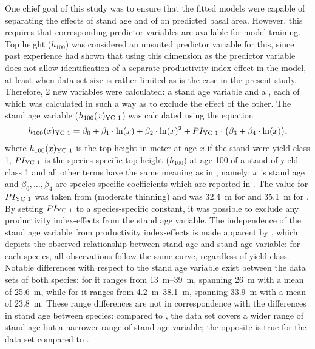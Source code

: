 One chief goal of this study was to ensure that the fitted models were capable of separating the effects of stand age and of \ProductivityIndexText{} on predicted basal area.  However, this requires that corresponding predictor variables are available for model training.  Top height (\(h_{100}\)) was considered an unsuited predictor variable for this, since past experience had shown that using this dimension as the predictor variable does not allow identification of a separate productivity index-effect in the model, at least when data set size is rather limited as is the case in the present study.  Therefore, 2 new variables were calculated:  a stand age variable and a \ProductivityIndexVariableText{}, each of which was calculated in such a way as to exclude the effect of the other. The stand age variable (\(h_{100}(x)_{\text{YC 1}}{}\)) was calculated using the equation
\begin{equation}
  \label{eq:StandAgeVariable}
  h_{100}(x)_{\text{YC 1}}{} = \beta_0 + \beta_1 \cdot \ln(x) + \beta_2 \cdot \ln(x)^2 + PI_{\text{YC 1}}{} \cdot \bigl(\beta_3 + \beta_4 \cdot \ln(x)\bigr),
\end{equation}
where \(h_{100}(x)_{\text{YC 1}}{}\) is the top height in meter at age \(x\) if the stand were yield class 1, \(PI_{\text{YC 1}}{}\) is the species-specific top height (\(h_{100}\)) at age \SI{100}{\year} of a stand of yield class 1 and all other terms have the same meaning as in , namely: \(x\) is stand age and \(\beta_0, \ldots, \beta_4\) are species-specific coefficients which are reported in  \parencite{Nagel1999}.  The value for \(PI_{\text{YC 1}}{}\) was taken from \textcite{Schober1995} (moderate thinning) and was \SI{32.4}{\meter} for \Beech{} and \SI{35.1}{\meter} for \Spruce{}.  By setting \(PI_{\text{YC 1}}{}\) to a species-specific constant, it was possible to exclude any productivity index-effects from the stand age variable.  The independence of the stand age variable from productivity index-effects is made apparent by , which depicts the observed relationship between stand age and stand age variable:  for each species, all observations follow the same curve, regardless of yield class.  Notable differences with respect to the stand age variable exist between the data sets of both species:  for \Beech{} it ranges from \SIrange{13}{39}{\meter}, spanning \SI{26}{\meter} with a mean of \SI{25.6}{\meter}, while for \Spruce{} it ranges from \SIrange{4.2}{38.1}{\meter}, spanning \SI{33.9}{\meter} with a mean of \SI{23.8}{\meter}.  These range differences are not in correspondence with the differences in stand age between species:  compared to \Spruce{}, the \Beech{} data set covers a wider range of stand age but a narrower range of stand age variable;  the opposite is true for the \Spruce{} data set compared to \Beech{}.

